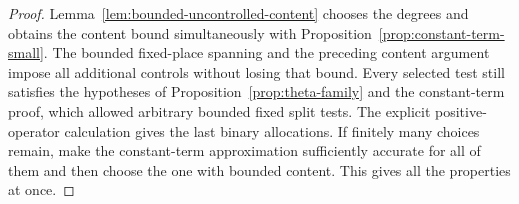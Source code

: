 \begin{proof}
 Lemma~\ref{lem:bounded-uncontrolled-content} chooses the degrees and
 obtains the content bound simultaneously with
 Proposition~\ref{prop:constant-term-small}.  The bounded fixed-place
 spanning and the preceding content argument impose all additional
 controls without losing that bound.  Every selected test still
 satisfies the hypotheses of Proposition~\ref{prop:theta-family} and
 the constant-term proof, which allowed arbitrary bounded fixed split
 tests.  The explicit positive-operator calculation gives the last
 binary allocations.  If finitely many choices remain, make the
 constant-term approximation sufficiently accurate for all of them
 and then choose the one with bounded content.  This gives all the
 properties at once.
\end{proof}

